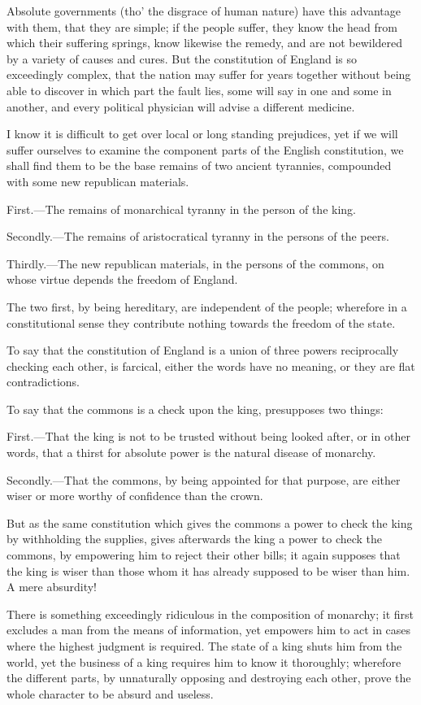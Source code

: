 \documentclass[12pt,oneside]{memoir}
\begin{document}
Absolute governments (tho' the disgrace of human nature) have this
advantage with them, that they are simple; if the people suffer,
they know the head from which their suffering springs, know likewise
the remedy, and are not bewildered by a variety of causes and cures.
But the constitution of England is so exceedingly complex, that the
nation may suffer for years together without being able to discover
in which part the fault lies, some will say in one and some in
another, and every political physician will advise a different
medicine.

I know it is difficult to get over local or long standing prejudices,
yet if we will suffer ourselves to examine the component parts of
the English constitution, we shall find them to be the base remains
of two ancient tyrannies, compounded with some new republican
materials.

First.---The remains of monarchical tyranny in the person of the king.

Secondly.---The remains of aristocratical tyranny in the persons of
the peers.

Thirdly.---The new republican materials, in the persons of the
commons, on whose virtue depends the freedom of England.

The two first, by being hereditary, are independent of the people;
wherefore in a constitutional sense they contribute nothing towards
the freedom of the state.

To say that the constitution of England is a union of three powers 
reciprocally checking each other, is farcical, either the words have
no meaning, or they are flat contradictions.

To say that the commons is a check upon the king, presupposes two
things:

First.---That the king is not to be trusted without being looked
after, or in other words, that a thirst for absolute power is the
natural disease of monarchy.

Secondly.---That the commons, by being appointed for that purpose,
are either wiser or more worthy of confidence than the crown.

But as the same constitution which gives the commons a power to
check the king by withholding the supplies, gives afterwards the
king a power to check the commons, by empowering him to reject their
other bills; it again supposes that the king is wiser than those 
whom it has already supposed to be wiser than him. A mere absurdity!

There is something exceedingly ridiculous in the composition of
monarchy; it first excludes a man from the means of information, yet
empowers him to act in cases where the highest judgment is required.
The state of a king shuts him from the world, yet the business of a
king requires him to know it thoroughly; wherefore the different
parts, by unnaturally opposing and destroying each other, prove the
whole character to be absurd and useless.
\end{document}
